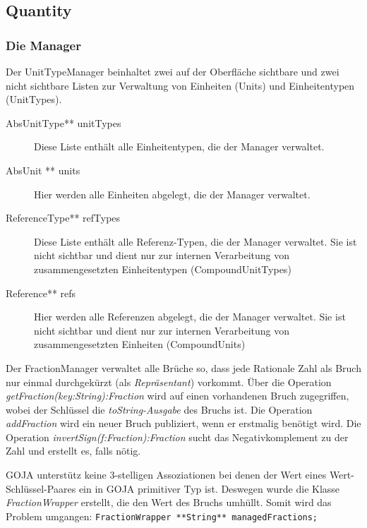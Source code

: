 \subsection{Quantity}

\subsubsection{Die Manager}


Der UnitTypeManager beinhaltet zwei auf der Oberfläche sichtbare und zwei nicht sichtbare Listen zur Verwaltung von Einheiten (Units) und Einheitentypen (UnitTypes).

\begin{description}
\item[AbsUnitType** unitTypes] Diese Liste enthält alle Einheitentypen, die der Manager verwaltet.
\item[AbsUnit ** units] Hier werden alle Einheiten abgelegt, die der Manager verwaltet.
\item[ReferenceType** refTypes] Diese Liste enthält alle Referenz-Typen, die der Manager verwaltet. Sie ist nicht sichtbar und dient nur zur internen Verarbeitung von zusammengesetzten Einheitentypen (CompoundUnitTypes)
\item[Reference** refs] Hier werden alle Referenzen abgelegt, die der Manager verwaltet. Sie ist nicht sichtbar und dient nur zur internen Verarbeitung von zusammengesetzten Einheiten (CompoundUnits)
\end{description}

\label{FractionManager}

Der FractionManager verwaltet alle Brüche so, dass jede Rationale Zahl als Bruch nur einmal durchgekürzt (als \emph{Repräsentant}) vorkommt.
Über die Operation \textit{getFraction(key:String):Fraction} wird auf einen vorhandenen Bruch zugegriffen, wobei der Schlüssel die \textit{toString-Ausgabe} des Bruchs ist.
Die Operation \textit{addFraction} wird ein neuer Bruch publiziert, wenn er erstmalig benötigt wird. Die Operation \textit{invertSign(f:Fraction):Fraction} sucht das Negativkomplement zu der Zahl und erstellt es, falls nötig.

GOJA unterstütz keine 3-stelligen Assoziationen bei denen der Wert eines Wert-Schlüssel-Paares ein in GOJA primitiver Typ ist. Deswegen wurde die Klasse \textit{FractionWrapper} erstellt, die den Wert des Bruchs umhüllt. Somit wird das Problem umgangen: \texttt{FractionWrapper **String** managedFractions;}


